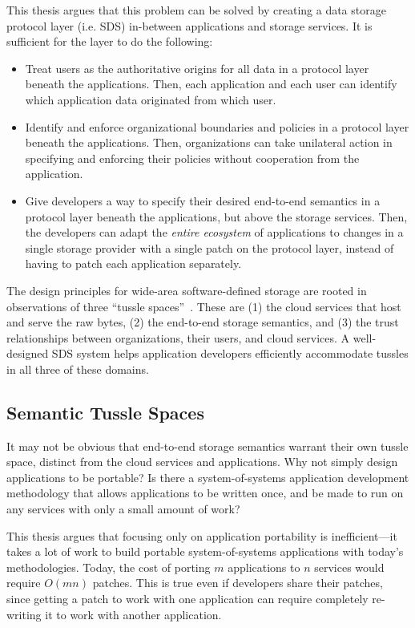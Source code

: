 This thesis argues that this problem can be solved by creating a data storage
protocol layer (i.e. SDS) in-between applications and storage services.  It is sufficient
for the layer to do the following:

\begin{itemize}
   \item Treat users as the authoritative origins for all data in a protocol
      layer beneath the applications.  Then, each application and each user
      can identify which application data originated from which user.
   \item Identify and enforce organizational boundaries and policies in a protocol layer
      beneath the applications.  Then, organizations can take unilateral action
      in specifying and enforcing their policies without cooperation from the
      application.
   \item Give developers a way to specify their desired end-to-end semantics in
      a protocol layer beneath the applications, but above the storage services.
      Then, the developers can adapt the \emph{entire ecosystem} of applications
      to changes in a single storage provider with a
      single patch on the protocol layer,
      instead of having to patch each application separately.
\end{itemize}

The design principles for wide-area software-defined storage are rooted in 
observations of three ``tussle spaces''~\cite{david-clark-tussle-spaces}.
These are (1) the cloud services that host and serve the raw
bytes, (2) the end-to-end storage semantics, and (3) the trust
relationships between organizations, their users, and cloud services.
A well-designed SDS system helps application developers efficiently accommodate tussles
in all three of these domains.

\subsection{Semantic Tussle Spaces}

It may not be obvious that end-to-end storage semantics warrant their own tussle
space, distinct from the cloud services and applications.  Why not simply
design applications to be portable?  Is there a system-of-systems application
development methodology that allows applications to be written once, and be made
to run on any services with only a small amount of work?

This thesis argues that focusing only on application portability is
inefficient---it takes a lot of work to build portable system-of-systems
applications with today's methodologies.
Today, the cost of porting $m$ applications to $n$ services
would require $O(mn)$ patches.  This is true even if developers share their
patches, since getting a patch to work with one application can require completely
re-writing it to work with another application.


